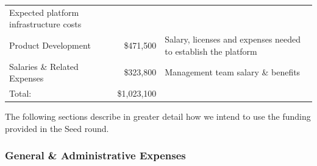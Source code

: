 \documentclass[10pt,openany]{book}
\begin{document}
\begin{longtable}[]{@{}lrl@{}}
\begin{minipage}[t]{0.50\columnwidth}
Expected platform infrastructure costs\strut
\end{minipage}\tabularnewline
\begin{minipage}[t]{0.28\columnwidth}\raggedright
Product Development\strut
\end{minipage} & \begin{minipage}[t]{0.13\columnwidth}\raggedleft
\$471,500\strut
\end{minipage} & \begin{minipage}[t]{0.50\columnwidth}\raggedright
Salary, licenses and expenses needed to establish the platform\strut
\end{minipage}\tabularnewline
\begin{minipage}[t]{0.28\columnwidth}\raggedright
Salaries \& Related Expenses\strut
\end{minipage} & \begin{minipage}[t]{0.13\columnwidth}\raggedleft
\$323,800\strut
\end{minipage} & \begin{minipage}[t]{0.50\columnwidth}\raggedright
Management team salary \& benefits\strut
\end{minipage}\tabularnewline
\begin{minipage}[t]{0.28\columnwidth}\raggedright
Total:\strut
\end{minipage} & \begin{minipage}[t]{0.13\columnwidth}\raggedleft
\$1,023,100\strut
\end{minipage} & \begin{minipage}[t]{0.50\columnwidth}\raggedright
\strut
\end{minipage}\tabularnewline
\bottomrule
\end{longtable}

The following sections describe in greater detail how we intend to use
the funding provided in the Seed round.

\newpage

\hypertarget{general-administrative-expenses}{%
\subsubsection{General \& Administrative
Expenses}\label{general-administrative-expenses}}
\end{document}
